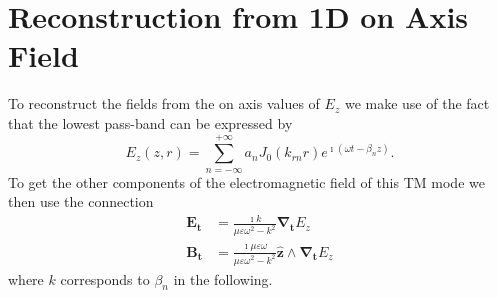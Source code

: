 \documentclass{report}
\begin{document}
\section{Reconstruction from 1D on Axis Field}\label{reconstruction}
To reconstruct the fields from the on axis values of $E_z$ we make use of the fact that the lowest pass-band can be expressed by \cite{bib:lapostolle}
\begin{equation*}
E_z(z,r) = \sum_{n=-\infty}^{+\infty} a_n J_0(k_{rn}r) e^{\imath(\omega t - \beta_n z)}.
\end{equation*}
To get the other components of the electromagnetic field of this TM mode we then use the connection \cite{bib:jackson}
\begin{align*}
\mathbf{E_t} &= \frac{\imath k}{\mu\varepsilon\omega^2 - k^2}\mathbf{\nabla_t}E_z\\
\mathbf{B_t} &= \frac{\imath \mu\varepsilon \omega}{\mu\varepsilon\omega^2 - k^2}\mathbf{\hat{z}}\wedge\mathbf{\nabla_t}E_z
\end{align*}
where $k$ corresponds to $\beta_n$ in the following.
\end{document}
